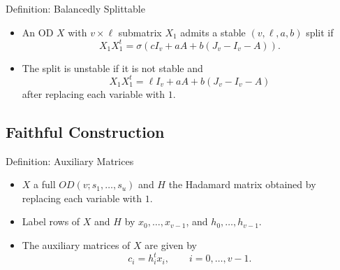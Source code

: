 \documentclass{beamer}
\begin{document}
\begin{frame}

  \begin{block}{Definition: Balancedly Splittable \cite[][]{split-od}} 
    \begin{itemize}
    \item An OD $X$ with $v \times \ell$ submatrix $X_1$ admits a stable
      $(v,\ell,a,b)$ split if
      $$
      X_1X_1^t = \sigma(cI_v + aA + b(J_v-I_v-A)).
      $$
    \item The split is unstable if it is not stable and
      $$
      X_1X_1^t = \ell I_v + aA + b(J_v-I_v-A)
      $$
      after replacing each variable with $1$.
    \end{itemize}
  \end{block}
  
\end{frame}


\subsection{Faithful Construction}

\begin{frame}

  \begin{block}{Definition: Auxiliary Matrices}
    \begin{itemize}
    \item $X$ a full $OD(v;s_1, \dots, s_u)$ and $H$ the Hadamard matrix
      obtained by replacing each variable with $1$.
    \item Label rows of $X$ and $H$ by $x_0, \dots, x_{v-1}$, and
      $h_0, \dots, h_{v-1}$.
    \item The auxiliary matrices of $X$ are given by
      $$
      c_i = h_i^tx_i, \qquad i = 0, \dots, v-1. 
      $$
    \end{itemize}
  \end{block}

\end{frame}
\end{document}
